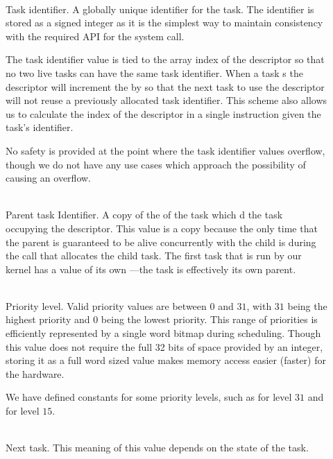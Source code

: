\documentclass[pdftex,10pt,a4paper]{article}
\begin{document}
\begin{description}
  \item[] \hfill \\
    Task identifier. A globally unique identifier for the task. The
    identifier is stored as a signed integer as it is the simplest way
    to maintain consistency with the required API for the
     system call.

    The task identifier value is tied to the array index of the
    descriptor so that no two live tasks can have the same task
    identifier. When a task s the descriptor will increment
    the  by  so that the next task to use the
    descriptor will not reuse a previously allocated task
    identifier. This scheme also allows us to calculate the index of
    the descriptor in a single instruction given the task's identifier.

    No safety is provided at the point where the task identifier
    values overflow, though we do not have any use cases which
    approach the possibility of causing an overflow.

  \item[] \hfill \\
    Parent task Identifier. A copy of the  of the task which
    d the task occupying the descriptor. This value is a
    copy because the only time that the parent is guaranteed to be
    alive concurrently with the child is during the  call
    that allocates the child task. The first task that is run by our
    kernel has a  value of its own ---the task is
    effectively its own parent.

  \item[] \hfill \\
    Priority level. Valid priority values are between $0$ and $31$,
    with $31$ being the highest priority and $0$ being the lowest
    priority. This range of priorities is efficiently represented by a
    single word bitmap during scheduling. Though this value
    does not require the full 32 bits of space provided by an integer,
    storing it as a full word sized value makes memory access easier
    (faster) for the hardware.

    We have defined constants for some priority levels, such as
     for level $31$ and
     for level $15$.

  \item[] \hfill \\
    Next task. This meaning of this value depends on the state of the
    task.


\end{description}
\end{document}
